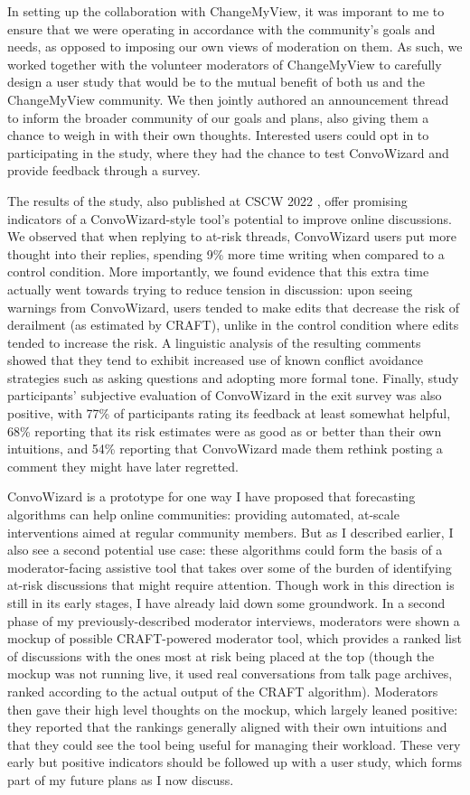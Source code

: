 \documentclass[11pt,letterpaper]{article}
\begin{document}
In setting up the collaboration with ChangeMyView, it was imporant to me to ensure that we were operating in accordance with the community's goals and needs, as opposed to imposing our own views of moderation on them.
As such, we worked together with the volunteer moderators of ChangeMyView to carefully design a user study that would be to the mutual benefit of both us and the ChangeMyView community.
We then jointly authored an announcement thread to inform the broader community of our goals and plans, also giving them a chance to weigh in with their own thoughts.
Interested users could opt in to participating in the study, where they had the chance to test ConvoWizard and provide feedback through a survey.

The results of the study, also published at CSCW 2022 \cite{chang_thread_2022}, offer promising indicators of a ConvoWizard-style tool's potential to improve online discussions.
We observed that when replying to at-risk threads, ConvoWizard users put more thought into their replies, spending 9\% more time writing when compared to a control condition.
More importantly, we found evidence that this extra time actually went towards trying to reduce tension in discussion: upon seeing warnings from ConvoWizard, users tended to make edits that decrease the risk of derailment (as estimated by CRAFT), unlike in the control condition where edits tended to increase the risk.
A linguistic analysis of the resulting comments showed that they tend to exhibit increased use of known conflict avoidance strategies such as asking questions and adopting more formal tone.
Finally, study participants' subjective evaluation of ConvoWizard in the exit survey was also positive, with 77\% of participants rating its feedback at least somewhat helpful, 68\% reporting that its risk estimates were as good as or better than their own intuitions, and 54\% reporting that ConvoWizard made them rethink posting a comment they might have later regretted.

ConvoWizard is a prototype for one way I have proposed that forecasting algorithms can help online communities: providing automated, at-scale interventions aimed at regular community members.
But as I described earlier, I also see a second potential use case: these algorithms could form the basis of a moderator-facing assistive tool that takes over some of the burden of identifying at-risk discussions that might require attention.
Though work in this direction is still in its early stages, I have already laid down some groundwork.
In a second phase of my previously-described moderator interviews, moderators were shown a mockup of possible CRAFT-powered moderator tool, which provides a ranked list of discussions with the ones most at risk being placed at the top (though the mockup was not running live, it used real conversations from talk page archives, ranked according to the actual output of the CRAFT algorithm).
Moderators then gave their high level thoughts on the mockup, which largely leaned positive: they reported that the rankings generally aligned with their own intuitions and that they could see the tool being useful for managing their workload.
These very early but positive indicators should be followed up with a user study, which forms part of my future plans as I now discuss.

\vspace{\baselineskip}


\end{document}
